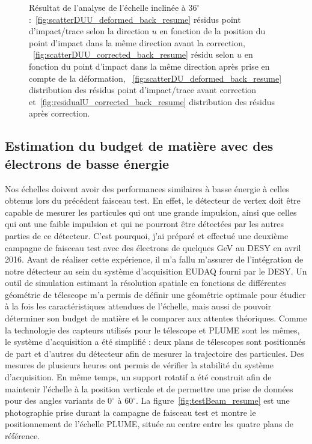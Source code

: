 \begin{figure}[!h]
    \caption{Résultat de l'analyse de l'échelle inclinée à $36^{\circ}$ :~\ref{fig:scatterDUU_deformed_back_resume} résidus point d'impact/trace selon la direction $u$ en fonction de la position du point d'impact dans la même direction avant la correction, ~\ref{fig:scatterDUU_corrected_back_resume} résidu selon $u$ en fonction du point d'impact dans la même direction après prise en compte de la déformation, ~\ref{fig:scatterDU_deformed_back_resume} distribution des résidus point d'impact/trace avant correction et~\ref{fig:residualU_corrected_back_resume} distribution des résidus après correction.}
    \label{fig:defCor_resume} 
   \end{figure}

    \subsection{Estimation du budget de matière avec des électrons de basse énergie}

  Nos échelles doivent avoir des performances similaires à basse énergie à celles obtenus lors du précédent faisceau test.
  En effet, le détecteur de vertex doit être capable de mesurer les particules qui ont une grande impulsion, ainsi que celles qui ont une faible impulsion et qui ne pourront être détectées par les autres parties de ce détecteur.
  C'est pourquoi, j'ai préparé et effectué une deuxième campagne de faisceau test avec des électrons de quelques GeV au DESY en avril 2016.
  Avant de réaliser cette expérience, il m'a fallu m'assurer de l'intégration de notre détecteur au sein du système d'acquisition EUDAQ fourni par le DESY. 
  Un outil de simulation estimant la résolution spatiale en fonctions de différentes géométrie de télescope m'a permis de définir une géométrie optimale pour étudier à la fois les caractéristiques attendues de l'échelle, mais aussi de pouvoir déterminer son budget de matière et le comparer aux attentes théoriques.
  Comme la technologie des capteurs utilisés pour le télescope et PLUME sont les mêmes, le système d'acquisition a été simplifié : deux plans de télescopes sont positionnés de part et d'autres du détecteur afin de mesurer la trajectoire des particules. 
  Des mesures de plusieurs heures ont permis de vérifier la stabilité du système d'acquisition. 
  En même temps, un support rotatif a été construit afin de maintenir l'échelle à la position verticale et de permettre une prise de données pour des angles variants de $0^{\circ}$ à $60^{\circ}$.
  La figure~\ref{fig:testBeam_resume} est une photographie prise durant la campagne de faisceau test et montre le positionnement de l'échelle PLUME, située au centre entre les quatre plans de référence.

